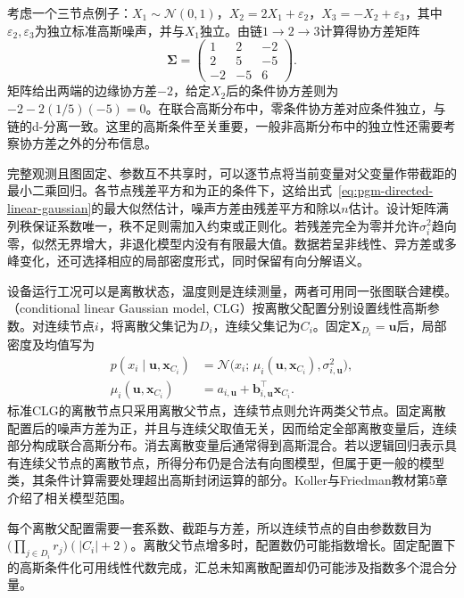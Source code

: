 考虑一个三节点例子：$X_1\sim\mathcal N(0,1)$，$X_2=2X_1+\varepsilon_2$，$X_3=-X_2+\varepsilon_3$，其中$\varepsilon_2,\varepsilon_3$为独立标准高斯噪声，并与$X_1$独立。由链$1\to2\to3$计算得协方差矩阵
\[
  \bm\Sigma=
  \begin{pmatrix}
    1&2&-2\\
    2&5&-5\\
    -2&-5&6
  \end{pmatrix}.
\]
矩阵给出两端的边缘协方差$-2$，给定$X_2$后的条件协方差则为$-2-2(1/5)(-5)=0$。在联合高斯分布中，零条件协方差对应条件独立，与链的d-分离一致。这里的高斯条件至关重要，一般非高斯分布中的独立性还需要考察协方差之外的分布信息。

完整观测且图固定、参数互不共享时，可以逐节点将当前变量对父变量作带截距的最小二乘回归。各节点残差平方和为正的条件下，这给出式~\eqref{eq:pgm-directed-linear-gaussian}的最大似然估计，噪声方差由残差平方和除以$n$估计。设计矩阵满列秩保证系数唯一，秩不足则需加入约束或正则化。若残差完全为零并允许$\sigma_i^2$趋向零，似然无界增大，非退化模型内没有有限最大值。数据若呈非线性、异方差或多峰变化，还可选择相应的局部密度形式，同时保留有向分解语义。

设备运行工况可以是离散状态，温度则是连续测量，两者可用同一张图联合建模。（conditional linear Gaussian model, CLG）按离散父配置分别设置线性高斯参数。对连续节点$i$，将离散父集记为$D_i$，连续父集记为$C_i$。固定$\bm X_{D_i}=\bm u$后，局部密度及均值写为
\[
  \begin{aligned}
    p(x_i\mid\bm u,\bm{x}_{C_i})
      &=\mathcal N\bigl(
        x_i;\,\mu_i(\bm u,\bm x_{C_i}),\sigma_{i,\bm u}^2\bigr),\\
    \mu_i(\bm u,\bm x_{C_i})
      &=a_{i,\bm u}+\bm b_{i,\bm u}^{\top}\bm{x}_{C_i}.
  \end{aligned}
\]
标准CLG的离散节点只采用离散父节点，连续节点则允许两类父节点。固定离散配置后的噪声方差为正，并且与连续父取值无关，因而给定全部离散变量后，连续部分构成联合高斯分布。消去离散变量后通常得到高斯混合。若以逻辑回归表示具有连续父节点的离散节点，所得分布仍是合法有向图模型，但属于更一般的模型类，其条件计算需要处理超出高斯封闭运算的部分。Koller与Friedman教材第5章介绍了相关模型范围。

每个离散父配置需要一套系数、截距与方差，所以连续节点的自由参数数目为$\bigl(\prod_{j\in D_i}r_j\bigr)(|C_i|+2)$。离散父节点增多时，配置数仍可能指数增长。固定配置下的高斯条件化可用线性代数完成，汇总未知离散配置却仍可能涉及指数多个混合分量。

